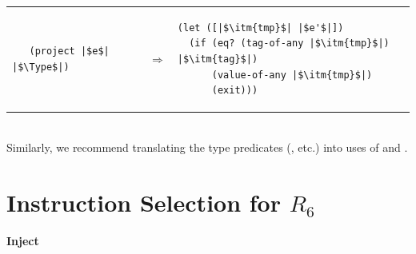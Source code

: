 \documentclass[11pt]{book}
\begin{document}
\begin{tabular}{lll}
\begin{minipage}{0.3\textwidth}
\begin{lstlisting}
   (project |$e$| |$\Type$|)
\end{lstlisting}
\end{minipage}
&
$\Rightarrow$
&
\begin{minipage}{0.5\textwidth}
\begin{lstlisting}
(let ([|$\itm{tmp}$| |$e'$|])
  (if (eq? (tag-of-any |$\itm{tmp}$|) |$\itm{tag}$|)
      (value-of-any |$\itm{tmp}$|)
      (exit)))
\end{lstlisting}
\end{minipage}
\end{tabular}  \\

Similarly, we recommend translating the type predicates
(, etc.) into uses of  and .

\section{Instruction Selection for $R_6$}
\label{sec:select-r6}

\paragraph{Inject}
\end{document}
